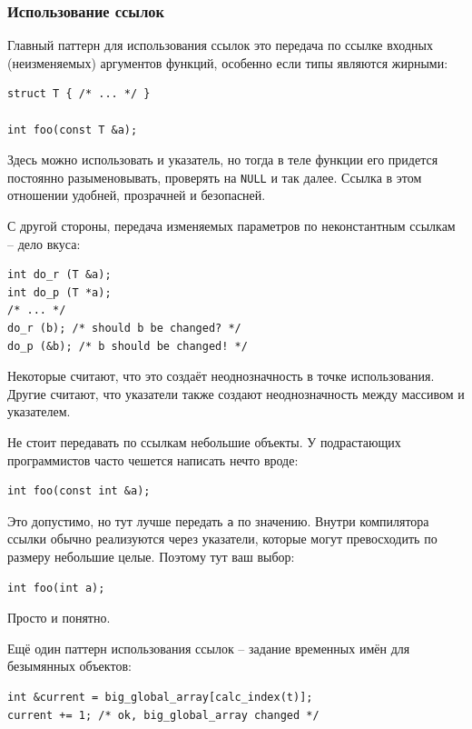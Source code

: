 \documentclass[a4paper,12pt,oneside]{article}
\begin{document}
\subsubsection{Использование ссылок}

Главный паттерн для использования ссылок это передача по ссылке входных (неизменяемых) аргументов функций, особенно если типы являются жирными:

\begin{lstlisting}
struct T { /* ... */ }

int foo(const T &a);
\end{lstlisting}

Здесь можно использовать и указатель, но тогда в теле функции его придется постоянно разыменовывать, проверять на \lstinline!NULL! и так далее. Ссылка в этом отношении удобней, прозрачней и безопасней.

С другой стороны, передача изменяемых параметров по неконстантным ссылкам -- дело вкуса:

\begin{lstlisting}
int do_r (T &a);
int do_p (T *a);
/* ... */
do_r (b); /* should b be changed? */
do_p (&b); /* b should be changed! */
\end{lstlisting}

Некоторые считают, что это создаёт неоднозначность в точке использования. Другие считают, что указатели также создают неоднозначность между массивом и указателем.

Не стоит передавать по ссылкам небольшие объекты. У подрастающих программистов часто чешется написать нечто вроде:

\begin{lstlisting}
int foo(const int &a);
\end{lstlisting}

Это допустимо, но тут лучше передать \lstinline!a! по значению. Внутри компилятора ссылки обычно реализуются через указатели, которые могут превосходить по размеру небольшие целые. Поэтому тут ваш выбор:

\begin{lstlisting}
int foo(int a);
\end{lstlisting}

Просто и понятно.

Ещё один паттерн использования ссылок -- задание временных имён для безымянных объектов:

\begin{lstlisting}
int &current = big_global_array[calc_index(t)];
current += 1; /* ok, big_global_array changed */
\end{lstlisting}
\end{document}
